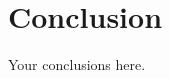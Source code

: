 \documentclass[12pt, colorlinks, glossary, boxes]{bp-book}
\begin{document}
% 


\chapter{Conclusion}
\label{chap:conclusion}

Your conclusions here.


\backmatter






\end{document}
